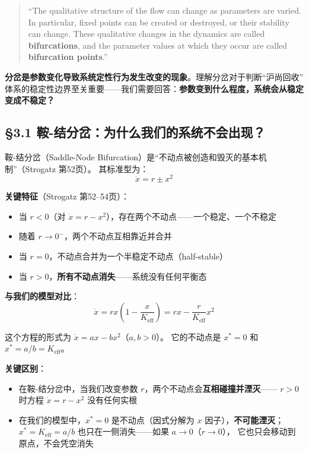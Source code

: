 \documentclass[12pt,a4paper]{article}
\begin{document}
\begin{quote}
\small
``The qualitative structure of the flow can change as parameters are varied. In particular,
fixed points can be created or destroyed, or their stability can change. These qualitative
changes in the dynamics are called \textbf{bifurcations}, and the parameter values at which
they occur are called \textbf{bifurcation points}.''
\end{quote}

\textbf{分岔是参数变化导致系统定性行为发生改变的现象}。理解分岔对于判断``沪尚回收''
体系的稳定性边界至关重要——我们需要回答：\textbf{参数变到什么程度，系统会从稳定变成不稳定？}

\subsection{\S3.1 鞍-结分岔：为什么我们的系统不会出现？}

鞍-结分岔（Saddle-Node Bifurcation）是``不动点被创造和毁灭的基本机制''（Strogatz 第52页）。
其标准型为：
\begin{equation}
\dot{x} = r \pm x^2
\end{equation}

\textbf{关键特征}（Strogatz 第52--54页）：
\begin{itemize}
  \item 当 $r < 0$（对 $\dot{x} = r - x^2$），存在两个不动点——一个稳定、一个不稳定
  \item 随着 $r \to 0^-$，两个不动点互相靠近并合并
  \item 当 $r = 0$，不动点合并为一个半稳定不动点（half-stable）
  \item 当 $r > 0$，\textbf{所有不动点消失}——系统没有任何平衡态
\end{itemize}

\textbf{与我们的模型对比}：
\begin{equation}
\dot{x} = r x \left(1 - \frac{x}{K_{\text{eff}}}\right)
       = r x - \frac{r}{K_{\text{eff}}} x^2
\end{equation}

这个方程的形式为 $\dot{x} = a x - b x^2$（$a, b > 0$）。
它的不动点是 $x^* = 0$ 和 $x^* = a/b = K_{\text{eff}}$。

\textbf{关键区别}：
\begin{itemize}
  \item 在鞍-结分岔中，当我们改变参数 $r$，两个不动点会\textbf{互相碰撞并湮灭}——
        $r > 0$ 时方程 $\dot{x} = r - x^2$ 没有任何实根
  \item 在我们的模型中，$x^* = 0$ 是不动点（因式分解为 $x$ 因子），\textbf{不可能湮灭}；
        $x^* = K_{\text{eff}} = a/b$ 也只在一侧消失——如果 $a \to 0$（$r \to 0$），
        它也只会移动到原点，不会凭空消失
\end{itemize}
\end{document}
